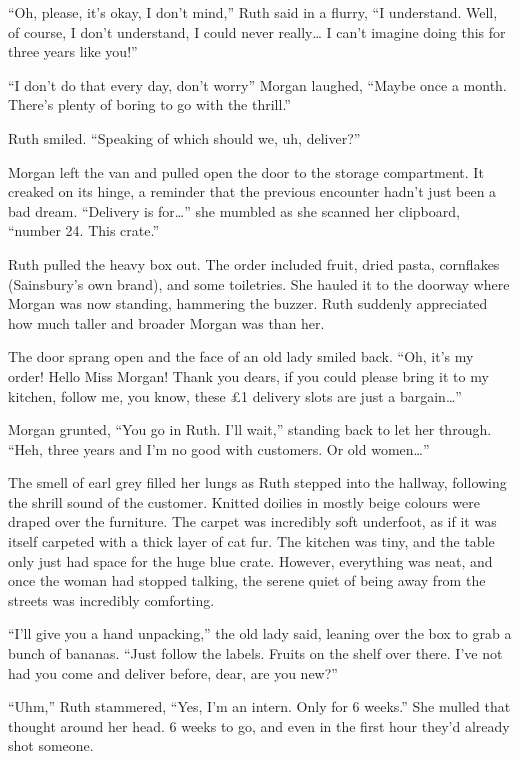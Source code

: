 “Oh, please, it’s okay, I don’t mind,” Ruth said in a flurry, “I understand. Well, of course, I don’t understand, I could never really… I can’t imagine doing this for three years like you!” 

“I don’t do that every day, don’t worry” Morgan laughed, “Maybe once a month. There’s plenty of boring to go with the thrill.”

Ruth smiled. “Speaking of which should we, uh, deliver?” 

Morgan left the van and pulled open the door to the storage compartment. It creaked on its hinge, a reminder that the previous encounter hadn’t just been a bad dream. “Delivery is for…” she mumbled as she scanned her clipboard, “number 24. This crate.” 

Ruth pulled the heavy box out. The order included fruit, dried pasta, cornflakes (Sainsbury’s own brand), and some toiletries. She hauled it to the doorway where Morgan was now standing, hammering the buzzer. Ruth suddenly appreciated how much taller and broader Morgan was than her.

The door sprang open and the face of an old lady smiled back. “Oh, it’s my order! Hello Miss Morgan! Thank you dears, if you could please bring it to my kitchen, follow me, you know, these £1 delivery slots are just a bargain…”

Morgan grunted, “You go in Ruth. I’ll wait,” standing back to let her through. “Heh, three years and I’m no good with customers. Or old women…”

The smell of earl grey filled her lungs as Ruth stepped into the hallway, following the shrill sound of the customer. Knitted doilies in mostly beige colours were draped over the furniture. The carpet was incredibly soft underfoot, as if it was itself carpeted with a thick layer of cat fur. The kitchen was tiny, and the table only just had space for the huge blue crate. However, everything was neat, and once the woman had stopped talking, the serene quiet of being away from the streets was incredibly comforting. 

“I’ll give you a hand unpacking,” the old lady said, leaning over the box to grab a bunch of bananas. “Just follow the labels. Fruits on the shelf over there. I’ve not had you come and deliver before, dear, are you new?”

“Uhm,” Ruth stammered, “Yes, I’m an intern. Only for 6 weeks.” She mulled that thought around her head. 6 weeks to go, and even in the first hour they’d already shot someone. 

